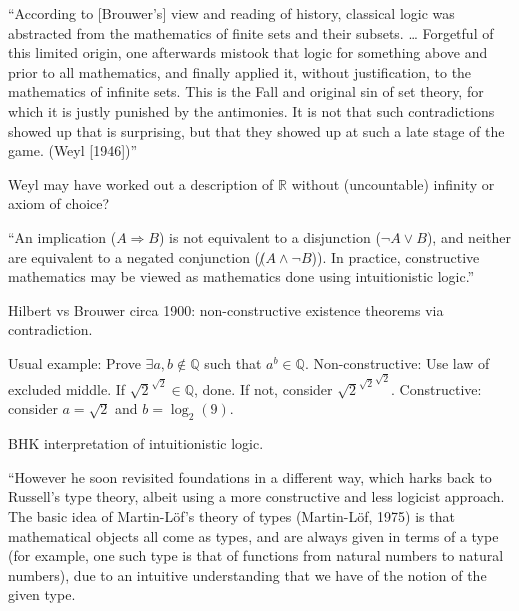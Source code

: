``According to [Brouwer’s] view and reading of history, 
classical logic was abstracted 
from the mathematics of finite sets and their subsets. \ldots 
Forgetful of this limited origin, 
one afterwards mistook that logic 
for something above and prior to all mathematics, 
and finally applied it, without justification, 
to the mathematics of infinite sets. 
This is the Fall and original sin of set theory, 
for which it is justly punished by the antimonies. 
It is not that such contradictions showed up that is surprising,
 but that they showed up at such a late stage of the game. 
 (Weyl [1946])''
 
Weyl may have worked out a description of
$\mathbb{R}$ without (uncountable) infinity or
axiom of choice?

\label{sec:Constructivism_IEP}
\cite{iep:Constructive_mathematics}

``An implication ($A \Rightarrow B$) is not equivalent 
to a disjunction ($\lnot A \vee B$), 
and neither are equivalent to a negated conjunction 
($\not (A \wedge \lnot B$)). 
In practice, constructive mathematics may be viewed 
as mathematics done using intuitionistic 
logic.''\cite{iep:Constructive_mathematics}

Hilbert vs Brouwer circa 1900: 
non-constructive existence theorems via contradiction.

Usual example: Prove $\exists a,b \notin \mathbb{Q}$
such that $a^b \in \mathbb{Q}$. \hfill\break
Non-constructive: Use law of excluded middle.
If $\sqrt{2}^{\sqrt{2}} \in \mathbb{Q}$, done.
If not, consider ${\sqrt{2}^{\sqrt{2}}}^{\sqrt{2}}$.
\hfill\break
Constructive: consider $a=\sqrt{2}$ and $b=\log_2(9)$.

BHK interpretation of intuitionistic 
logic\cite{wiki:Brouwer_Heyting_Kolmogorov_interpretation}.

\label{sec:Martin_Lof_IEP}

``However he soon revisited foundations in a different way, 
which harks back to Russell's type theory, 
albeit using a more constructive and less logicist approach. 
The basic idea of Martin-Löf's theory of types (Martin-Löf, 1975) 
is
that mathematical objects all come as types, 
and are always given in terms of a
type (for example, one such type is that of functions 
from natural numbers to
natural numbers), due to an intuitive understanding 
that we have of the notion
of the given type.


